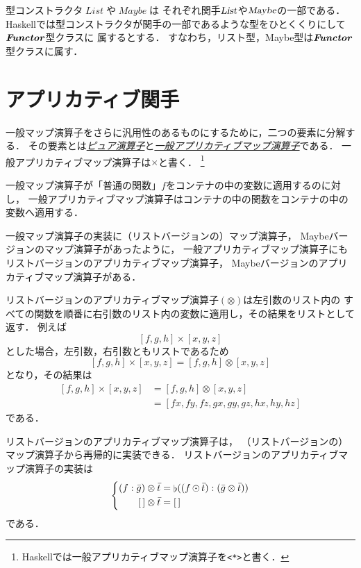 \documentclass[a5paper,draft]{jsbook}
\newcommand{\programminglanguage}[1]{\textsf{#1}}
\newcommand{\haskell}{\programminglanguage{Haskell}}
\newcommand{\keyword}[1]{{\underline{\emph{#1}}}}
\newcommand{\code}[1]{\texttt{#1}}
\newcommand{\mathFunctor}[1]{\mathop{\textsl{#1}}} %
\newcommand{\mathTypeConstructor}[1]{\mathit{#1}} %
\newcommand{\mathTypeClass}[1]{\textbf{\emph{#1}}} %
\newcommand{\mathListWith}[1]{\left[#1\right]}
\newcommand{\mathListVar}[1]{\Bar{#1}}
\DeclareMathOperator{\mathList}{\mathTypeConstructor{List}}
\DeclareMathOperator{\mathMaybe}{\mathTypeConstructor{Maybe}}
\newcommand{\mathEmptyList}{{[\,]}}%
\DeclareMathOperator{\mathConcat}{\flat}%
\newcommand{\mathBinaryOperator}[1]{\operatorname{#1}}
\newcommand{\mathApplicativeGeneralMap}{\times}
\newcommand{\mathApplicativeMap}{\otimes}
\newcommand{\mathMap}{\mathBinaryOperator{\odot}}
\begin{document}
型コンストラクタ$\mathList$や$\mathMaybe$は
それぞれ関手$\mathFunctor{List}$や$\mathFunctor{Maybe}$の一部である．
\haskell では型コンストラクタが関手の一部であるような型をひとくくりにして$\mathTypeClass{Functor}$型クラスに
属するとする．
すなわち，リスト型，Maybe型は$\mathTypeClass{Functor}$型クラスに属す．

\section{アプリカティブ関手}

一般マップ演算子をさらに汎用性のあるものにするために，二つの要素に分解する．
その要素とは\keyword{ピュア演算子}と\keyword{一般アプリカティブマップ演算子}である．
一般アプリカティブマップ演算子は$\mathApplicativeGeneralMap$と書く．%
\footnote{\haskell では一般アプリカティブマップ演算子を\code{<*>}と書く．}

一般マップ演算子が「普通の関数」$f$をコンテナの中の変数に適用するのに対し，
一般アプリカティブマップ演算子はコンテナの中の関数をコンテナの中の変数へ適用する．

一般マップ演算子の実装に（リストバージョンの）マップ演算子，
Maybeバージョンのマップ演算子があったように，
一般アプリカティブマップ演算子にもリストバージョンのアプリカティブマップ演算子，
Maybeバージョンのアプリカティブマップ演算子がある．

リストバージョンのアプリカティブマップ演算子$(\mathApplicativeMap)$は左引数のリスト内の
すべての関数を順番に右引数のリスト内の変数に適用し，その結果をリストとして返す．
例えば
$$
\mathListWith{f,g,h}\mathApplicativeGeneralMap\mathListWith{x,y,z}
$$
とした場合，左引数，右引数ともリストであるため
$$
\mathListWith{f,g,h}\mathApplicativeGeneralMap\mathListWith{x,y,z}
=\mathListWith{f,g,h}\mathApplicativeMap\mathListWith{x,y,z}
$$
となり，その結果は
\begin{align}
\mathListWith{f,g,h}\mathApplicativeGeneralMap\mathListWith{x,y,z}
&=\mathListWith{f,g,h}\mathApplicativeMap\mathListWith{x,y,z}\\
&=\mathListWith{fx,fy,fz,gx,gy,gz,hx,hy,hz}
\end{align}
である．

リストバージョンのアプリカティブマップ演算子は，
（リストバージョンの）マップ演算子から再帰的に実装できる．
リストバージョンのアプリカティブマップ演算子の実装は
\begin{equation}
\left\{
\begin{split}
(f:\mathListVar{g})\mathApplicativeMap\mathListVar{t}&=\mathConcat((f\mathMap\mathListVar{t}):(\mathListVar{g}\mathApplicativeMap\mathListVar{t}))\\
\mathEmptyList\mathApplicativeMap\mathListVar{t}&=\mathEmptyList
\end{split}
\right.
\end{equation}
である．
\end{document}

